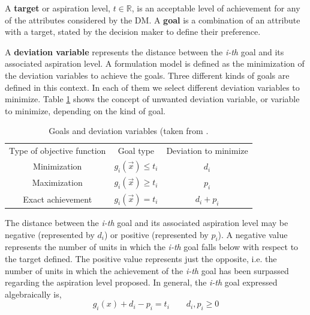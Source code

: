 \begin{defi}\label{defi:targetgoal}
A \textbf{target} or aspiration level, $t \in \mathbb{R}$, is an acceptable level of achievement for any of the attributes considered by the DM. A \textbf{goal} is a combination of an attribute with a target, stated by the decision maker to define their preference. 
\end{defi}

\begin{defi}\label{defi:deviation}
A \textbf{deviation variable} represents the distance between the \textit{i-th} goal and its associated aspiration level. A formulation model is defined as the minimization of the deviation variables to achieve the goals. Three different kinds of goals are defined in this context. In each of them we select different deviation variables to minimize. Table \ref{tab:deviation-variables} shows the concept of unwanted deviation variable, or variable to minimize, depending on the kind of goal.

\begin{table}
\caption{Goals and deviation variables (taken from \citep{Romero1993}.}
\centering
\begin{tabular}{ccc}
\hline \noalign{\smallskip}
Type of objective function & Goal type & Deviation to minimize\\
\noalign{\smallskip} \hline
Minimization & $g_i(\vec x) \leq t_i$ & $d_i$ \\
Maximization & $g_i(\vec x) \geq t_i$ & $p_i$ \\
Exact achievement & $g_i(\vec x) = t_i$ & $d_i + p_i$ \\
\hline
\end{tabular}
\label{tab:deviation-variables}
\end{table}  

The distance between the \emph{i-th} goal and its associated aspiration level may be negative (represented by $d_i$) or positive (represented by $p_i$). A negative value represents the number of units in which the \textit{i-th} goal falls below with respect to the target defined. The positive value represents just the opposite, i.e. the number of units in which the achievement of the \textit{i-th} goal has been surpassed regarding the aspiration level proposed. In general, the \textit{i-th} goal expressed algebraically is, 
\begin{equation}\label{eq:goal-mat}
g_i(x) + d_i - p_i = t_i \qquad d_i, p_i \geq 0
\end{equation}
\end{defi}

